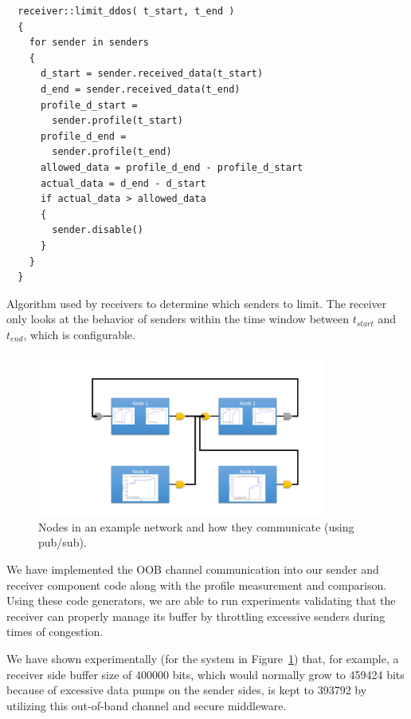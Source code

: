 \begin{listing}[ht!]
  \begin{verbatim}
  receiver::limit_ddos( t_start, t_end )
  {
    for sender in senders
    {
      d_start = sender.received_data(t_start)
      d_end = sender.received_data(t_end)
      profile_d_start =
        sender.profile(t_start)
      profile_d_end =
        sender.profile(t_end)
      allowed_data = profile_d_end - profile_d_start
      actual_data = d_end - d_start
      if actual_data > allowed_data
      {
        sender.disable()
      }
    }
  }
  \end{verbatim}
  \caption{Algorithm used by receivers to determine which senders to
    limit.  The receiver only looks at the behavior of senders within
    the time window between $t_{start}$ and $t_{end}$, which is
    configurable.}
  \label{lst:ddos_alg}
\end{listing}


\begin{figure}[ht!]
  \centering
  \includegraphics[width=0.85\textwidth]{../doc/src/images/results/example_setup.png}
  \caption{Nodes in an example network and how they communicate (using
    pub/sub).}
  \label{fig:ddos}
\end{figure}

We have implemented the OOB channel communication into our sender and
receiver component code along with the profile measurement and
comparison.  Using these code generators, we are able to run
experiments validating that the receiver can properly manage its
buffer by throttling excessive senders during times of congestion. 

We have shown experimentally (for the system in Figure~\ref{fig:ddos})
that, for example, a receiver side buffer size of 400000 bits, which
would normally grow to 459424 bits because of excessive data pumps on
the sender sides, is kept to 393792 by utilizing this out-of-band
channel and secure middleware.

